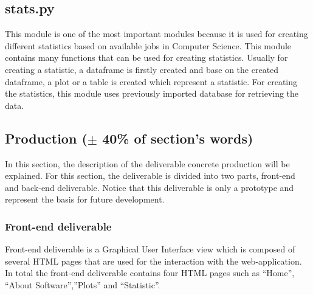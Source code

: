 \documentclass[conference,compsoc]{IEEEtran}
\begin{document}
\subsection{stats.py}
This module is one of the most important modules because it is used for creating different statistics based on available jobs in Computer Science. This module contains many functions that can be used for creating statistics. Usually for creating a statistic, a dataframe is firstly created and base on the created dataframe, a plot or a table is created which represent a statistic. For creating the statistics, this module uses previously imported database for retrieving the data.  

\subsection{Production ($\pm$ 40\% of section's words)}
In this section, the description of the deliverable concrete production will be explained. For this section, the deliverable is divided into two parts, front-end and back-end deliverable. Notice that this deliverable is only a prototype and represent the basis for future development.     

\subsubsection{Front-end deliverable}
Front-end deliverable is a Graphical User Interface view which is composed of several HTML pages that are used for the interaction with the web-application. In total the front-end deliverable contains four HTML pages such as “Home”, “About Software”,”Plots” and “Statistic”. 
\end{document}
